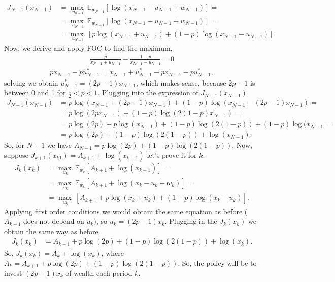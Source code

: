 \documentclass[11pt, english]{article}
\begin{document}
\begin{align}
J_{N-1}(x_{N-1})&=\underset{u_{n-1}}{\max\ }\mathbb{E}_{w_{N-1}}\left[\log(x_{N-1}-u_{N-1}+w_{N-1})\right]=\\
&=\underset{u_{N-1}}{\max\ }\mathbb{E}_{w_{N-1}}[\log(x_{N-1}-u_{N-1}+w_{N-1})]=\\
&=\underset{u_{N-1}}{\max\ }\left[p\log(x_{N-1}+u_{N-1})+(1-p)\log(x_{N-1}-u_{N-1})\right].
\end{align}
Now, we derive and apply FOC to find the maximum,
\begin{align}
\frac{p}{x_{N-1}+u_{N-1}}-\frac{1-p}{x_{N-1}-u_{N-1}}=0
\end{align}
\begin{align}
px_{N-1}-pu_{N-1}^*=x_{N-1}+u_{N-1}^*-px_{N-1}-pu_{N-1}^*,
\end{align}
solving we obtain $u_{N-1}^*=(2p-1)x_{N-1}$, which makes sense, because $2p-1$ is between 0 and 1 for $\frac{1}{2}<p<1$. Plugging into the expression of $J_{N-1}(x_{N-1})$
\begin{align}
J_{N-1}(x_{N-1})&=p\log(x_{N-1}+(2p-1)x_{N-1})+(1-p)\log(x_{N-1}-(2p-1)x_{N-1})=\\
&=p\log(2px_{N-1})+(1-p)\log(2(1-p)x_{N-1})=\\
&=p\log(2p)+p\log(x_{N-1})+(1-p)\log(2(1-p))+(1-p)\log(x_{N-1}=\\
&=p\log(2p)+(1-p)\log(2(1-p))+\log(x_{N-1}).
\end{align}
So, for $N-1$ we have $A_{N-1}=p\log(2p)+(1-p)\log(2(1-p))$. Now, suppose $J_{k+1}(x_{k1})=A_{k+1}+\log(x_{k+1})$ let's prove it for $k$:
\begin{align}
J_{k}(x_{k})&=\underset{u_{k}}{\max\ }\mathbb{E}_{w_{k}}\left[A_{k+1}+\log(x_{k+1})\right]=\\
&=\underset{u_{k}}{\max\ }\mathbb{E}_{w_{k}}\left[A_{k+1}+\log(x_{k}-u_{k}+w_{k})\right]=\\
&=\underset{u_{k}}{\max\ }\left[A_{k+1}+ p\log(x_{k}+u_{k})+(1-p)\log(x_{k}-u_{k})\right].
\end{align} 
Applying first order conditions we would obtain the same equation as before ($A_{k+1}$ does not depend on $u_k$), so $u_k=(2p-1)x_k$. Plugging in the $J_k(x_k)$ we obtain the same way as before
\begin{align}
J_{k}(x_{k})&=A_{k+1}+p\log(2p)+(1-p)\log(2(1-p))+\log(x_{k}).
\end{align}
So, $J_k(x_k)=A_k+\log(x_k)$, where $A_k=A_{k+1}+p\log(2p)+(1-p)\log(2(1-p))$. So, the policy will be to invest $(2p-1)x_k$ of wealth each period $k$.
\end{document}
